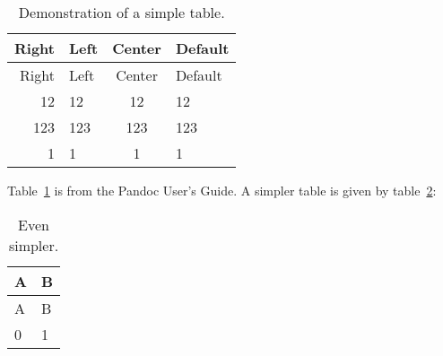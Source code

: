\begin{longtable}[]{@{}rlcl@{}}
\caption{Demonstration of a simple table. \label{tbl:1}}\tabularnewline
\toprule
Right & Left & Center & Default\tabularnewline
\midrule
\endfirsthead
\toprule
Right & Left & Center & Default\tabularnewline
\midrule
\endhead
12 & 12 & 12 & 12\tabularnewline
123 & 123 & 123 & 123\tabularnewline
1 & 1 & 1 & 1\tabularnewline
\bottomrule
\end{longtable}

\providecommand{\crefformat}[2]{}{}
\providecommand{\Crefformat}[2]{}{}
\crefformat{table}{table~#2#1#3}
\Crefformat{table}{Table~#2#1#3}

\providecommand{\plusnamesingular}{}
\providecommand{\starnamesingular}{}
\providecommand{\cref}{\plusnamesingular~\ref}
\providecommand{\Cref}{\starnamesingular~\ref}

\renewcommand{\starnamesingular}{Table}\Cref{tbl:1} is from the Pandoc
User's Guide. A simpler table is given by
\renewcommand{\plusnamesingular}{table}\cref{tbl:2}:

\begin{longtable}[]{@{}ll@{}}
\caption{Even simpler. \label{tbl:2}}\tabularnewline
\toprule
A & B\tabularnewline
\midrule
\endfirsthead
\toprule
A & B\tabularnewline
\midrule
\endhead
0 & 1\tabularnewline
\bottomrule
\end{longtable}
